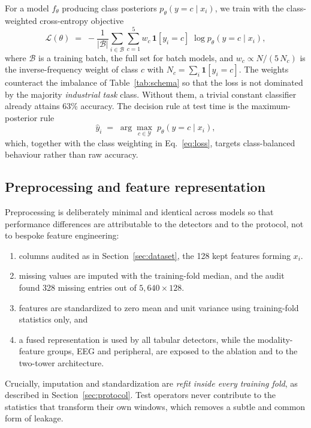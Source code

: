 \documentclass{llncs}
\begin{document}
For a model $f_\theta$ producing class posteriors $p_\theta(y=c \mid x_i)$, we train
with the class-weighted cross-entropy objective
\begin{equation}
\mathcal{L}(\theta)\;=\;-\frac{1}{|\mathcal{B}|}\sum_{i\in\mathcal{B}}
\sum_{c=1}^{5} w_c\,\mathbf{1}[y_i=c]\;\log p_\theta(y=c\mid x_i),
\label{eq:loss}
\end{equation}
where $\mathcal{B}$ is a training batch, the full set for batch models, and
$w_c \propto N / (5\,N_c)$ is the inverse-frequency weight of class $c$ with
$N_c=\sum_i \mathbf{1}[y_i=c]$. The weights counteract the imbalance of
Table~\ref{tab:schema} so that the loss is not dominated by the majority
\emph{industrial task} class. Without them, a trivial constant classifier already
attains 63\% accuracy. The decision rule at test time is the maximum-posterior rule
\begin{equation}
\hat{y}_i \;=\; \arg\max_{c\in\mathcal{Y}}\; p_\theta(y=c \mid x_i),
\label{eq:argmax}
\end{equation}
which, together with the class weighting in Eq.~\eqref{eq:loss}, targets
class-balanced behaviour rather than raw accuracy.

\subsection{Preprocessing and feature representation}

Preprocessing is deliberately minimal and identical across models so that performance
differences are attributable to the detectors and to the protocol, not to bespoke
feature engineering:
\begin{enumerate}
\item columns audited as in Section~\ref{sec:dataset}, the 128 kept features forming
$x_i$.
\item missing values are imputed with the training-fold median, and the audit found
328 missing entries out of $5{,}640\times128$.
\item features are standardized to zero mean and unit variance using training-fold
statistics only, and
\item a fused representation is used by all tabular detectors, while the
modality-feature groups, \ac{EEG} and peripheral, are exposed to the ablation and to
the two-tower architecture.
\end{enumerate}
Crucially, imputation and standardization are \emph{refit inside every training fold},
as described in Section~\ref{sec:protocol}. Test operators never contribute to the
statistics that transform their own windows, which removes a subtle and common form of
leakage.
\end{document}
